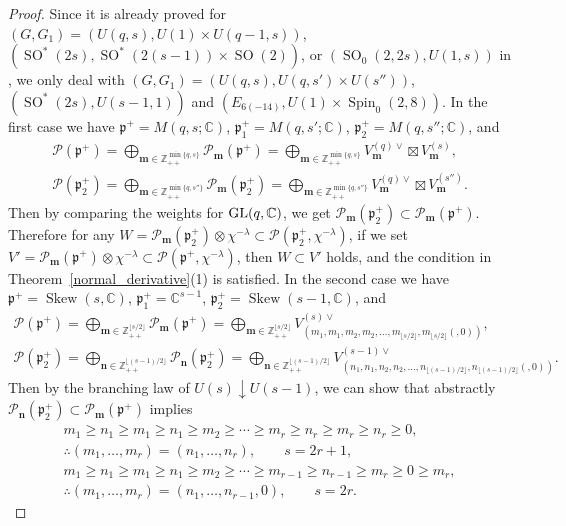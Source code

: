 \documentclass[pdftex]{sigma}
\numberwithin{equation}{section}
\newcommand{\bm}{\mathbf{m}}
\newcommand{\bn}{\mathbf{n}}
\newcommand{\BZ}{\mathbb{Z}}
\newcommand{\BC}{\mathbb{C}}
\newcommand{\fp}{\mathfrak{p}}
\newcommand{\cP}{\mathcal{P}}
\newcommand{\Skew}{\operatorname{Skew}}
\begin{document}
\begin{proof}
Since it is already proved for $(G,G_1)=(U(q,s),U(1)\times U(q-1,s))$, $(\operatorname{SO}^*(2s),\allowbreak \operatorname{SO}^*(2(s-1))\times \operatorname{SO}(2))$,
or $(\operatorname{SO}_0(2,2s),U(1,s))$ in \cite{KP2},
we only deal with $(G,G_1)=(U(q,s),U(q,s')\times U(s''))$, $(\operatorname{SO}^*(2s),U(s-1,1))$ and $(E_{6(-14)},U(1)\times \operatorname{Spin}_0(2,8))$.
In the first case we have $\fp^+=M(q,s;\BC)$, $\fp^+_1=M(q,s';\BC)$, $\fp^+_2=M(q,s'';\BC)$, and
\begin{gather*}
\cP(\fp^+)=\bigoplus_{\bm\in\BZ_{++}^{\min\{q,s\}}}\cP_\bm(\fp^+)
=\bigoplus_{\bm\in\BZ_{++}^{\min\{q,s\}}}V_\bm^{(q)\vee}\boxtimes V_\bm^{(s)},\\
\cP(\fp^+_2)=\bigoplus_{\bm\in\BZ_{++}^{\min\{q,s''\}}}\cP_\bm(\fp^+_2)
=\bigoplus_{\bm\in\BZ_{++}^{\min\{q,s''\}}}V_\bm^{(q)\vee}\boxtimes V_\bm^{(s'')}.
\end{gather*}
Then by comparing the weights for ${\rm GL}(q,\BC)$, we get $\cP_\bm(\fp^+_2)\subset \cP_\bm(\fp^+)$.
Therefore for any $W=\cP_\bm(\fp^+_2)\otimes\chi^{-\lambda}\subset\cP(\fp^+_2,\chi^{-\lambda})$,
if we set $V'=\cP_\bm(\fp^+)\otimes\chi^{-\lambda}\subset\cP(\fp^+,\chi^{-\lambda})$, then $W\subset V'$ holds, and the condition in
Theorem~\ref{normal_derivative}(1) is satisfied. In the second case we have $\fp^+=\Skew(s,\BC)$, $\fp^+_1=\BC^{s-1}$,
$\fp^+_2=\Skew(s-1,\BC)$, and
\begin{gather*}
\cP(\fp^+) =\bigoplus_{\bm\in\BZ_{++}^{\lfloor s/2\rfloor}}\cP_\bm(\fp^+)
=\bigoplus_{\bm\in\BZ_{++}^{\lfloor s/2\rfloor}}V_{(m_1,m_1,m_2,m_2,\ldots,m_{\lfloor s/2\rfloor},m_{\lfloor s/2\rfloor}(,0))}^{(s)\vee},\\
\cP(\fp^+_2) =\bigoplus_{\bn\in\BZ_{++}^{\lfloor (s-1)/2\rfloor}}\cP_\bn(\fp^+_2)
=\bigoplus_{\bn\in\BZ_{++}^{\lfloor (s-1)/2\rfloor}}
V_{(n_1,n_1,n_2,n_2,\ldots,n_{\lfloor (s-1)/2\rfloor},n_{\lfloor (s-1)/2\rfloor}(,0))}^{(s-1)\vee}.
\end{gather*}
Then by the branching law of $U(s)\downarrow U(s-1)$, we can show that abstractly $\cP_\bn(\fp^+_2)\subset\cP_\bm(\fp^+)$ implies
\begin{gather*}
 m_1\ge n_1\ge m_1\ge n_1\ge m_2\ge\cdots\ge m_r\ge n_r\ge m_r\ge n_r\ge 0, \\
 \therefore (m_1,\ldots,m_r)=(n_1,\ldots,n_r), \qquad s=2r+1,\\
m_1\ge n_1\ge m_1\ge n_1\ge m_2\ge\cdots\ge m_{r-1}\ge n_{r-1}\ge m_r\ge 0\ge m_r, \\
 \therefore (m_1,\ldots,m_r)=(n_1,\ldots,n_{r-1},0), \qquad s=2r.

\end{gather*}
\end{proof}
\end{document}
